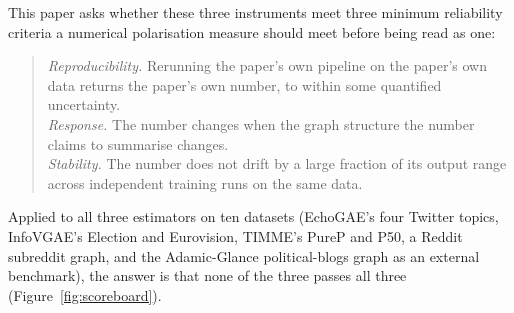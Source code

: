 \documentclass[letterpaper]{article} %
\begin{document}
This paper asks whether these three instruments meet three
minimum reliability criteria a numerical polarisation measure
should meet before being read as one:

\begin{quote}
\emph{Reproducibility.} Rerunning the paper's own pipeline on
the paper's own data returns the paper's own number, to within
some quantified uncertainty.\\[2pt]
\emph{Response.} The number changes when the graph structure
the number claims to summarise changes.\\[2pt]
\emph{Stability.} The number does not drift by a large fraction
of its output range across independent training runs on the
same data.
\end{quote}

Applied to all three estimators on ten datasets (EchoGAE's four
Twitter topics, InfoVGAE's Election and Eurovision, TIMME's
PureP and P50, a Reddit subreddit graph, and the Adamic-Glance
political-blogs graph as an external benchmark), the answer is
that none of the three passes all three
(Figure~\ref{fig:scoreboard}).
\end{document}
